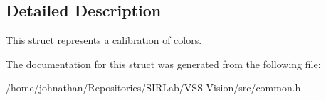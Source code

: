 \subsection{Detailed Description}
This struct represents a calibration of colors. 

The documentation for this struct was generated from the following file\+:\begin{DoxyCompactItemize}
\item 
/home/johnathan/\+Repositories/\+S\+I\+R\+Lab/\+V\+S\+S-\/\+Vision/src/common.\+h\end{DoxyCompactItemize}
